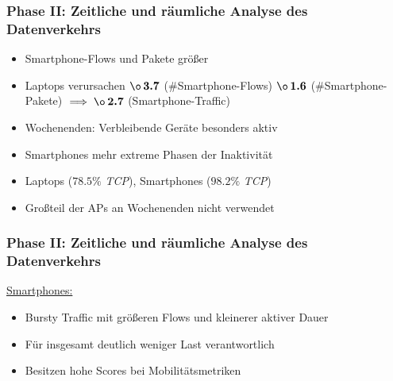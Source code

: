 \documentclass{beamer}
\begin{document}
\begin{frame}
  \frametitle{Phase II: Zeitliche und räumliche Analyse des Datenverkehrs}
  \begin{itemize}
    \item Smartphone-Flows und Pakete größer
    \item Laptops verursachen $\boldsymbol{\o \thinspace 3.7}$ (\#Smartphone-Flows)\newline
    \phantom \quad\quad\quad\quad\quad\quad\quad\quad\thinspace\thinspace\thinspace\thinspace\thinspace $\boldsymbol{\o \thinspace 1.6}$ (\#Smartphone-Pakete)\newline
    \phantom \quad\quad\quad\quad\quad\quad\thinspace\thinspace $\implies \boldsymbol{\o \thinspace 2.7}$ (Smartphone-Traffic)
    \item Wochenenden: Verbleibende Geräte besonders aktiv
    \item Smartphones mehr extreme Phasen der Inaktivität
    \item Laptops ($\boldsymbol{78.5 \%}$ \textit{TCP}), Smartphones ($\boldsymbol{98.2 \%}$ \textit{TCP})
    \item Großteil der APs an Wochenenden nicht verwendet
  \end{itemize}
\end{frame}

\begin{frame}
  \frametitle{Phase II: Zeitliche und räumliche Analyse des Datenverkehrs}

  \begin{figure}[H]
    \centering
    \end{figure}

    \underline{Smartphones:}
    \begin{itemize}
      \item Bursty Traffic mit größeren Flows und kleinerer aktiver Dauer
      \item Für insgesamt deutlich weniger Last verantwortlich
      \item Besitzen hohe Scores bei Mobilitätsmetriken
    \end{itemize}
\end{frame}
\end{document}
